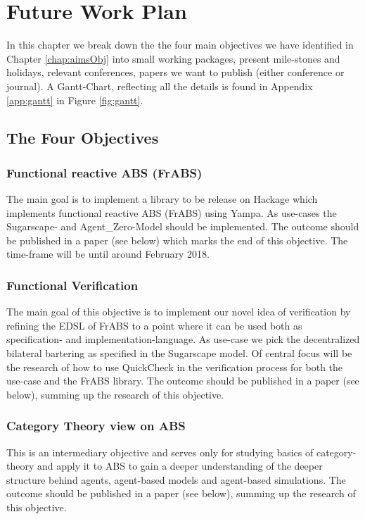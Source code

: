 \chapter{Future Work Plan}
\label{chap:future}


In this chapter we break down the the four main objectives we have identified in Chapter \ref{chap:aimsObj} into small working packages, present mile-stones and holidays, relevant conferences, papers we want to publish (either conference or journal). A Gantt-Chart, reflecting all the details is found in Appendix \ref{app:gantt} in Figure \ref{fig:gantt}.

\section{The Four Objectives}
\subsection{Functional reactive ABS (FrABS)}
The main goal is to implement a library to be release on Hackage which implements functional reactive ABS (FrABS) using Yampa. As use-cases the Sugarscape- and Agent\_Zero-Model should be implemented. The outcome should be published in a paper (see below) which marks the end of this objective. The time-frame will be until around February 2018.

\subsection{Functional Verification}
The main goal of this objective is to implement our novel idea of verification by refining the EDSL of FrABS to a point where it can be used both as specification- and implementation-language. As use-case we pick the decentralized bilateral bartering as specified in the Sugarscape model. Of central focus will be the research of how to use QuickCheck in the verification process for both the use-case and the FrABS library. The outcome should be published in a paper (see below), summing up the research of this objective.

\subsection{Category Theory view on ABS}
This is an intermediary objective and serves only for studying basics of category-theory and apply it to ABS to gain a deeper understanding of the deeper structure behind agents, agent-based models and agent-based simulations.  The outcome should be published in a paper (see below), summing up the research of this objective.

